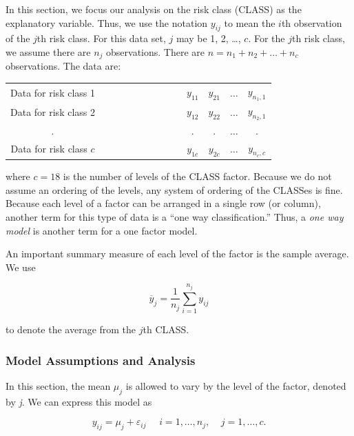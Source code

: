 \linejed


In this section, we focus our analysis on the risk class (CLASS) as
the explanatory variable. Thus, we use the notation $y_{ij}$ to mean
the $i$th observation of the $j$th risk class. For this data set,
$j$ may be 1, 2, \ldots , $c$. For the $j$th risk class, we assume
there are $n_j$ observations. There are $n=n_1+n_2+\ldots +n_c$
observations. The data are:

\begin{center}
\begin{tabular}{cccccc}
Data for risk class 1 & \ \ \ \ \ \ \ \ \ \ \ \ \ \ \  & $y_{11}$ & $y_{21}$ & $%
\ldots $ & $y_{n_1,1}$ \\
Data for risk class 2 &  & $y_{12}$ & $y_{22}$ & $\ldots $ & $y_{n_2,1}$ \\
. &  & $.$ & $.$ & $\ldots$ & $.$ \\
Data for risk class $c$ &  & $y_{1c}$ & $y_{2c}$ & $\ldots $ & $y_{n_c,c}$%
\end{tabular}
\end{center}

\noindent where $c=18$ is the number of levels of the CLASS factor.
Because we do not assume an ordering of the levels, any system of
ordering of the CLASSes is fine. Because each level of a factor can
be arranged in a single row (or column), another term for this type
of data is a ``one way classification.'' Thus, a \textit{one way
model} is another term for a one factor model.

An important summary measure of each level of the factor is the sample
average. We use

\begin{equation*}
\overline{y}_{j}=\frac{1}{n_{j}}\sum_{i=1}^{n_{j}}y_{ij}
\end{equation*}

\noindent to denote the average from the $j$th CLASS.

\subsubsection*{Model Assumptions and Analysis}

In this section, the mean $\mu_j$ is allowed to vary by the level of
the factor, denoted by \textit{j}. We can express this model as

\begin{equation*}
y_{ij}=\mu_{j}+ \varepsilon_{ij}\ \ \ \ \ \ i=1,\ldots ,n_{j},\ \ \
\ \ j=1,\ldots ,c.
\end{equation*}

